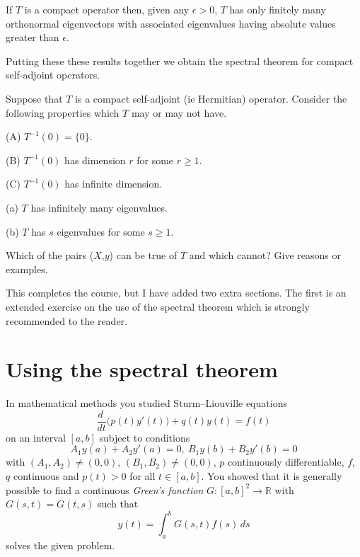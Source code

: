 \begin{lemma} If $T$ is a compact operator then, given any
$\epsilon>0$, $T$ has only finitely many
orthonormal eigenvectors with associated eigenvalues
having absolute values greater than $\epsilon$.
\end{lemma}
Putting these these results together we obtain
the spectral theorem for compact self-adjoint operators.
\begin{exercise} Suppose that $T$ is a compact self-adjoint
(ie Hermitian) operator.
Consider the following properties which $T$ may or may not have.

(A) $T^{-1}(0)=\{0\}$.

(B) $T^{-1}(0)$ has dimension $r$ for some $r\geq 1$.

(C) $T^{-1}(0)$ has infinite dimension.

(a) $T$ has infinitely many eigenvalues.

(b) $T$ has $s$ eigenvalues for some $s\geq 1$.

Which of the pairs ($X$,$y$) can be true of $T$ and which cannot?
Give reasons or examples.
\end{exercise}
This completes the course, but I have added two extra sections.
The first is an extended exercise on the use of the spectral
theorem which is strongly recommended to the reader.
\section{Using the spectral theorem}\label{S;use spectral}
In mathematical methods you studied
Sturm--Liouville equations
\[\frac{d\ }{dt}\biggl(p(t)y'(t)\biggr)+q(t)y(t)=f(t)\]
on an interval $[a,b]$ subject to conditions
\[A_{1}y(a)+A_{2}y'(a)=0,\ B_{1}y(b)+B_{2}y'(b)=0\]
with $(A_{1},A_{2})\neq(0,0)$, $(B_{1},B_{2})\neq(0,0)$,
$p$ continuously differentiable, $f$, $q$ continuous and $p(t)>0$
for all $t\in[a,b]$. You showed that it is generally possible
to find a continuous \emph{Green's function} 
$G:[a,b]^{2}\rightarrow{\mathbb R}$ 
with $G(s,t)=G(t,s)$ such that
\[y(t)=\int_{a}^{b}G(s,t)f(s)\,ds\]
solves the given problem.

